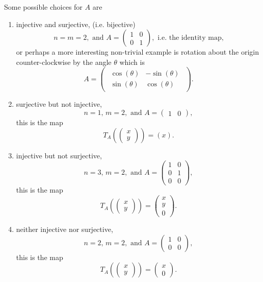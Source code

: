 \documentclass[oneside,10pt]{memoir}
\newcounter{pass}
\begin{document}
\begin{enumerate}
\begin{solution}
Some possible choices for $A$ are
\begin{enumerate}
\item
injective and surjective, (i.e. bijective)
$$n=m=2, \text{ and } A = \begin{pmatrix} 1 & 0 \\0 & 1 \end{pmatrix}, \text{ i.e. the identity map,}$$
or perhaps a more interesting non-trivial example is rotation about the origin counter-clockwise by the angle $\theta$ which is
$$A = \begin{pmatrix}\begin{array}{lr} \cos(\theta) & -\sin(\theta) \\ \sin(\theta) & \cos(\theta) \end{array}\end{pmatrix}.$$
\item
surjective but not injective,
$$n=1, \, m=2 , \text{ and } A= \begin{pmatrix}1&0\end{pmatrix},$$
this is the map
$$T_A \left ( \begin{pmatrix} x \\ y\end{pmatrix} \right ) = (x).$$
\item
injective but not surjective,
$$n=3, \, m=2, \text{ and } A= \begin{pmatrix}1&0\\0&1\\0&0\end{pmatrix},$$
this is the map
$$T_A \left ( \begin{pmatrix} x \\ y\end{pmatrix} \right ) = \begin{pmatrix} x \\ y\\ 0\end{pmatrix}.$$
\item
neither injective nor surjective,
$$n=2, \, m=2, \text{ and } A= \begin{pmatrix}1&0\\0&0\end{pmatrix},$$
this is the map
$$T_A \left ( \begin{pmatrix} x \\ y\end{pmatrix} \right ) = \begin{pmatrix} x \\ 0\end{pmatrix}.$$
\end{enumerate}

\end{solution}
\setcounter{pass}{\value{enumi}}
\end{enumerate}
\end{document}
